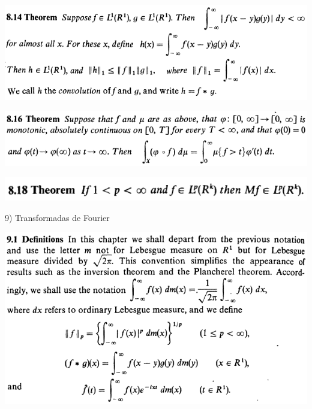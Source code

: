 \documentclass[12pt]{article}
\begin{document}
		\begin{center}
		\includegraphics{8ponto14}
		\end{center}

		\begin{center}
		\includegraphics{8ponto16}
		\end{center}

		\begin{center}
		\includegraphics{8ponto18}
		\end{center}

\vspace{3mm}

9) Transformadas de Fourier

\vspace{3mm}

		\begin{center}
		\includegraphics{d9ponto1}
		\end{center}
\end{document}
